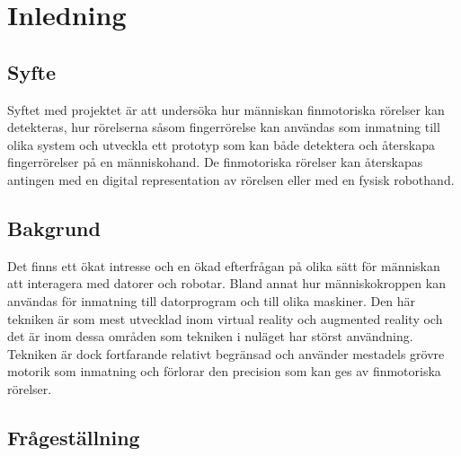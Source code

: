 \documentclass[a4paper]{article}
\begin{document}



\begin{abstract}

\end{abstract}

\begin{otherlanguage}{english}
    \begin{abstract}
    \end{abstract}
\end{otherlanguage}

\tableofcontents

\begin{sloppypar}

    \section{Inledning}
    \subsection{Syfte}
    Syftet med projektet är att undersöka hur människan finmotoriska rörelser kan detekteras, hur rörelserna såsom fingerrörelse kan användas som inmatning till olika system
    och utveckla ett prototyp som kan både detektera och återskapa fingerrörelser på en människohand.
    De finmotoriska rörelser kan återskapas antingen med en digital representation av rörelsen eller med en fysisk robothand.
    \subsection{Bakgrund}
    Det finns ett ökat intresse och en ökad efterfrågan på olika sätt för människan att interagera med datorer och robotar.
    Bland annat hur människokroppen kan användas för inmatning till datorprogram och till olika maskiner.
    Den här tekniken är som mest utvecklad inom virtual reality och augmented reality och det är inom dessa områden som tekniken i nuläget har störst användning.
    Tekniken är dock fortfarande relativt begränsad och använder mestadels grövre motorik som inmatning och förlorar den precision som kan ges av finmotoriska rörelser.


    \subsection{Frågeställning}


\end{sloppypar}
\end{document}
